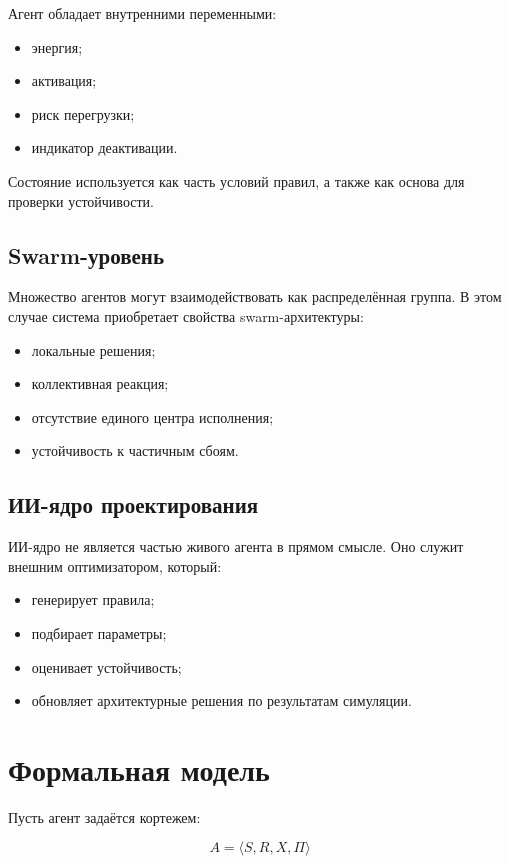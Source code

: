 \documentclass[12pt,a4paper]{article}
\begin{document}
Агент обладает внутренними переменными:
\begin{itemize}
    \item энергия;
    \item активация;
    \item риск перегрузки;
    \item индикатор деактивации.
\end{itemize}

Состояние используется как часть условий правил, а также как основа для проверки устойчивости.

\subsection{Swarm-уровень}

Множество агентов могут взаимодействовать как распределённая группа. В этом случае система приобретает свойства swarm-архитектуры:
\begin{itemize}
    \item локальные решения;
    \item коллективная реакция;
    \item отсутствие единого центра исполнения;
    \item устойчивость к частичным сбоям.
\end{itemize}

\subsection{ИИ-ядро проектирования}

ИИ-ядро не является частью живого агента в прямом смысле. Оно служит внешним оптимизатором, который:
\begin{itemize}
    \item генерирует правила;
    \item подбирает параметры;
    \item оценивает устойчивость;
    \item обновляет архитектурные решения по результатам симуляции.
\end{itemize}

\section{Формальная модель}

Пусть агент задаётся кортежем:

\[
A = \langle S, R, X, \Pi \rangle
\]
\end{document}
